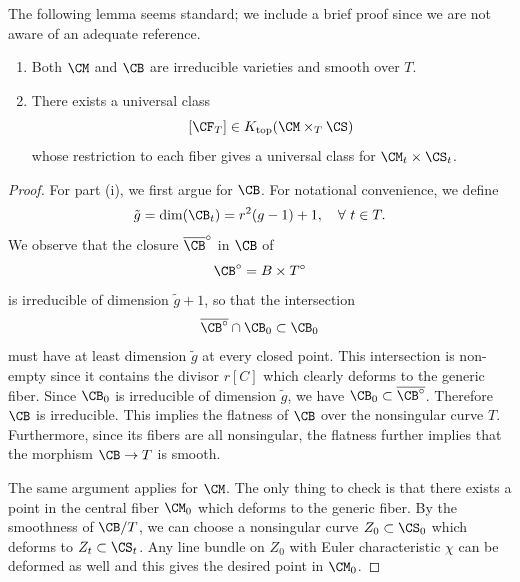 The following lemma seems standard; we include a brief proof  since we are not aware of an adequate reference.
\begin{lem}
\notready\label{lem4.1}
\begin{enumerate}

\item[(i)] Both $\CM$ and $\CB$ are irreducible varieties and smooth over $T$.
\item[(ii)] There exists a universal class
\[
[\CF_T] \in K_{\mathrm{top}}(\CM\times_{T} \CS)
\]
whose restriction to each fiber gives a universal class for $\CM_t \times \CS_t$.
\end{enumerate}

\end{lem}
\begin{proof}

For part (i), we first argue for $\CB$. For notational convenience, we define
\[
\tilde{g} = \mathrm{dim}(\CB_t) = r^2(g-1)+1, \quad \forall~t \in T.
\]
We observe that the closure $\overline\CB^{\circ}$ in $\CB$ of
\[
\CB^{\circ} = B \times T^\circ
\]
is irreducible of dimension $\tilde{g}+1$, so that the intersection
\[
\overline{\CB^{\circ}}\cap \CB_0 \subset \CB_0
\]
must have at least dimension $\tilde{g}$ at every closed point.  This intersection is non-empty since it contains the divisor $r[C]$ which clearly deforms to the generic fiber. Since $\CB_0$ is irreducible of dimension $\tilde{g}$, we have $\CB_0 \subset \overline{\CB^{\circ}}$. Therefore $\CB$ is irreducible. This implies the flatness of $\CB$ over the nonsingular curve $T$. Furthermore, since its fibers are all nonsingular, the flatness further implies that the morphism $\CB \to T$ is smooth.

The same argument applies for $\CM$. The only thing to check is that there exists a point in the central fiber $\CM_0$ which deforms to the generic fiber.  By the smoothness of $\CB/T$,  we can choose a nonsingular curve $Z_0 \subset \CS_0$ which deforms to $Z_t \subset \CS_t$.  Any line bundle on $Z_0$ with Euler characteristic $\chi$ can be deformed as well and this gives the desired point in $\CM_0$.



\end{proof}
